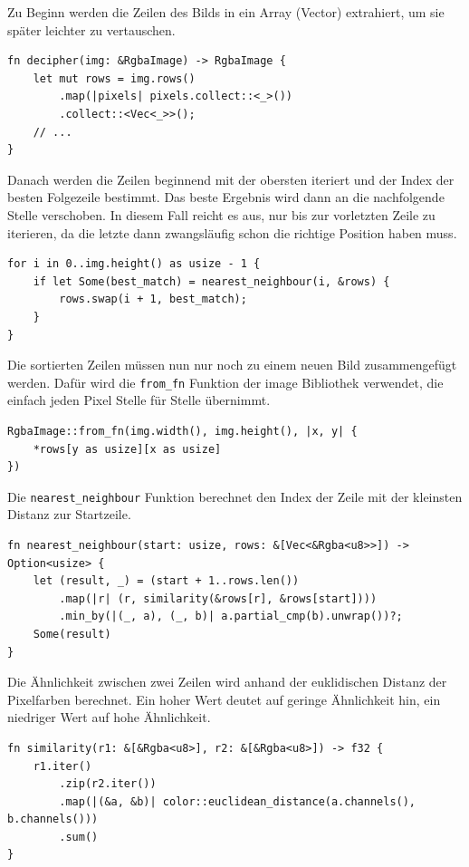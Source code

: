 Zu Beginn werden die Zeilen des Bilds in ein Array (Vector) extrahiert, um sie später leichter zu vertauschen.
\begin{verbatim}
fn decipher(img: &RgbaImage) -> RgbaImage {
    let mut rows = img.rows()
        .map(|pixels| pixels.collect::<_>())
        .collect::<Vec<_>>();
    // ...
}
\end{verbatim}
Danach werden die Zeilen beginnend mit der obersten iteriert und der Index der besten Folgezeile bestimmt. 
Das beste Ergebnis wird dann an die nachfolgende Stelle verschoben. In diesem Fall reicht es aus, nur bis zur vorletzten Zeile
zu iterieren, da die letzte dann zwangsläufig schon die richtige Position haben muss.
\begin{verbatim}
for i in 0..img.height() as usize - 1 {
    if let Some(best_match) = nearest_neighbour(i, &rows) {
        rows.swap(i + 1, best_match);
    }
}
\end{verbatim}
Die sortierten Zeilen müssen nun nur noch zu einem neuen Bild zusammengefügt werden. Dafür wird die \verb|from_fn| Funktion der image Bibliothek verwendet,
die einfach jeden Pixel Stelle für Stelle übernimmt.
\begin{verbatim}
RgbaImage::from_fn(img.width(), img.height(), |x, y| {
    *rows[y as usize][x as usize]
})
\end{verbatim}
Die \verb|nearest_neighbour| Funktion berechnet den Index der Zeile mit der kleinsten Distanz zur Startzeile.
\begin{verbatim}
fn nearest_neighbour(start: usize, rows: &[Vec<&Rgba<u8>>]) -> Option<usize> {
    let (result, _) = (start + 1..rows.len())
        .map(|r| (r, similarity(&rows[r], &rows[start])))
        .min_by(|(_, a), (_, b)| a.partial_cmp(b).unwrap())?;
    Some(result)
}
\end{verbatim}
Die Ähnlichkeit zwischen zwei Zeilen wird anhand der euklidischen Distanz der Pixelfarben berechnet. 
Ein hoher Wert deutet auf geringe Ähnlichkeit hin, ein niedriger Wert auf hohe Ähnlichkeit.
\begin{verbatim}
fn similarity(r1: &[&Rgba<u8>], r2: &[&Rgba<u8>]) -> f32 {
    r1.iter()
        .zip(r2.iter())
        .map(|(&a, &b)| color::euclidean_distance(a.channels(), b.channels()))
        .sum()
}
\end{verbatim}
\newpage
